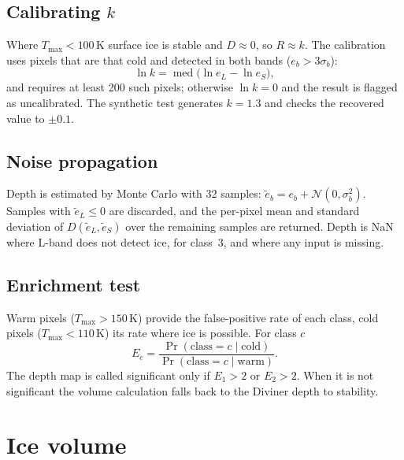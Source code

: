 \documentclass[11pt,a4paper]{article}
\DeclareMathOperator{\med}{med}
\begin{document}
\subsection{Calibrating $k$}
Where $T_{\max}<100$\,K surface ice is stable and $D\approx0$, so $R\approx k$. The calibration
uses pixels that are that cold and detected in both bands ($e_b>3\sigma_b$):
\begin{equation}
  \ln k = \med\big(\ln e_L-\ln e_S\big),
\end{equation}
and requires at least 200 such pixels; otherwise $\ln k=0$ and the result is flagged as
uncalibrated. The synthetic test generates $k=1.3$ and checks the recovered value to $\pm0.1$.

\subsection{Noise propagation}
Depth is estimated by Monte Carlo with 32 samples:
$\tilde e_b = e_b+\mathcal{N}(0,\sigma_b^2)$. Samples with $\tilde e_L\le0$ are discarded, and
the per-pixel mean and standard deviation of $D(\tilde e_L,\tilde e_S)$ over the remaining
samples are returned. Depth is NaN where L-band does not detect ice, for class~3, and where any
input is missing.

\subsection{Enrichment test}
Warm pixels ($T_{\max}>150$\,K) provide the false-positive rate of each class, cold pixels
($T_{\max}<110$\,K) its rate where ice is possible. For class $c$
\begin{equation}
  E_c = \frac{\Pr(\text{class}=c\mid\text{cold})}{\Pr(\text{class}=c\mid\text{warm})}.
\end{equation}
The depth map is called significant only if $E_1>2$ or $E_2>2$. When it is not significant the
volume calculation falls back to the Diviner depth to stability.

\section{Ice volume}
\end{document}
